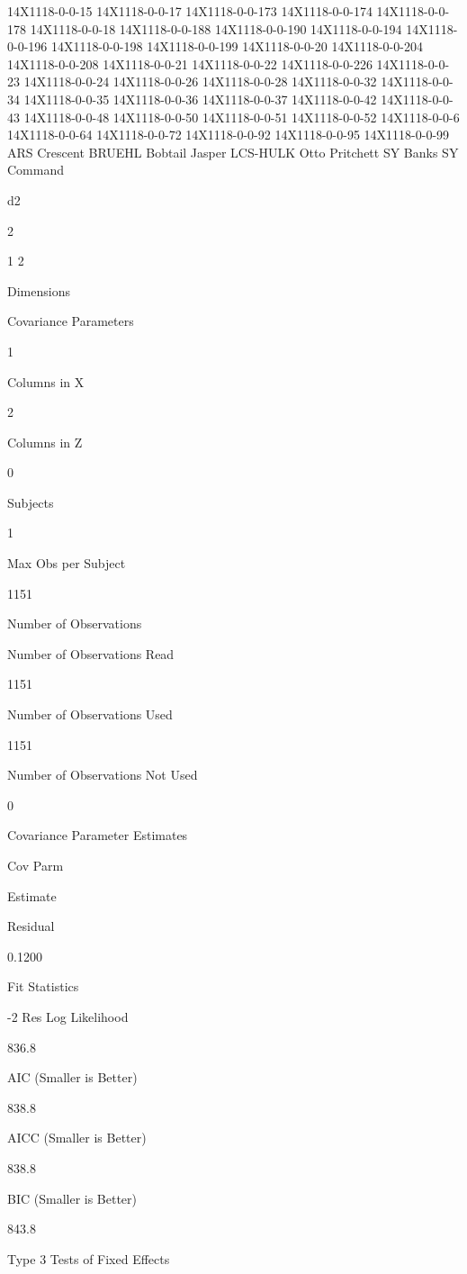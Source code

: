 \documentclass[
]{book}
\begin{document}
14X1118-0-0-15 14X1118-0-0-17 14X1118-0-0-173 14X1118-0-0-174 14X1118-0-0-178 14X1118-0-0-18 14X1118-0-0-188 14X1118-0-0-190 14X1118-0-0-194 14X1118-0-0-196 14X1118-0-0-198 14X1118-0-0-199 14X1118-0-0-20 14X1118-0-0-204 14X1118-0-0-208 14X1118-0-0-21 14X1118-0-0-22 14X1118-0-0-226 14X1118-0-0-23 14X1118-0-0-24 14X1118-0-0-26 14X1118-0-0-28 14X1118-0-0-32 14X1118-0-0-34 14X1118-0-0-35 14X1118-0-0-36 14X1118-0-0-37 14X1118-0-0-42 14X1118-0-0-43 14X1118-0-0-48 14X1118-0-0-50 14X1118-0-0-51 14X1118-0-0-52 14X1118-0-0-6 14X1118-0-0-64 14X1118-0-0-72 14X1118-0-0-92 14X1118-0-0-95 14X1118-0-0-99 ARS Crescent BRUEHL Bobtail Jasper LCS-HULK Otto Pritchett SY Banks SY Command

d2

2

1 2

Dimensions

Covariance Parameters

1

Columns in X

2

Columns in Z

0

Subjects

1

Max Obs per Subject

1151

Number of Observations

Number of Observations Read

1151

Number of Observations Used

1151

Number of Observations Not Used

0

Covariance Parameter Estimates

Cov Parm

Estimate

Residual

0.1200

Fit Statistics

-2 Res Log Likelihood

836.8

AIC (Smaller is Better)

838.8

AICC (Smaller is Better)

838.8

BIC (Smaller is Better)

843.8

Type 3 Tests of Fixed Effects
\end{document}
